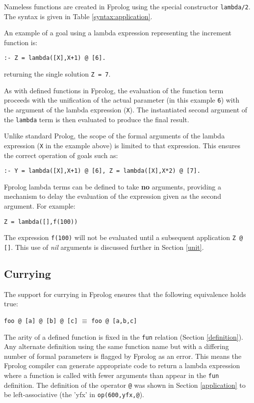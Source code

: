 \documentclass[a4paper,11pt,twoside]{article}
\begin{document}
Nameless functions are created in Fprolog using the special constructor
\texttt{lambda/2}.  The syntax is given in Table \ref{syntax:application}.

An example of a goal using a lambda expression representing the increment
function is:

\texttt{:- Z = lambda([X],X+1) @ [6].}

returning the single solution \texttt{Z = 7}.

As with defined functions in Fprolog,
the evaluation of the function term proceeds
with the unification of the actual parameter (in this example
\texttt{6}) with the argument of the lambda expression (\texttt{X}).
The instantiated second argument of the \texttt{lambda} term is then evaluated
to produce the final result.

Unlike standard Prolog, the scope of the formal arguments of the lambda
expression (\texttt{X} in the example above) is limited to that expression.
This ensures the correct operation of goals such as:\\
\centerline{\texttt{:- Y = lambda([X],X+1) @ [6], Z = lambda([X],X*2) @ [7].}}

Fprolog lambda terms can be defined to take \textbf{no} arguments, providing a
mechanism to delay the evaluation of the expression given as the second
argument.  For example:\\
\centerline{\texttt{Z = lambda([],f(100))}}
The expression \texttt{f(100)} will not be evaluated until a subsequent application
\texttt{Z @ []}.  This use of \textit{nil} arguments is discussed further in
Section \ref{unit}.

\subsection{Currying}

The support for currying in Fprolog ensures that the following equivalence holds
true:\\
\centerline{\texttt{foo @ [a] @ [b] @ [c]} $\equiv$ \texttt{foo @ [a,b,c]}}

The arity of a defined function is fixed in the \texttt{fun} relation
(Section \ref{definition}). Any alternate definition using the same function
name but with a differing number of formal parameters is flagged by Fprolog
as an error.
This means the Fprolog compiler can generate appropriate code to return a lambda
expression where a function is called with fewer arguments than appear in the
\texttt{fun} definition. The definition of the operator \texttt{@} was shown in
Section \ref{application} to be left-associative (the 'yfx' in \texttt{op(600,yfx,@}).
\end{document}
